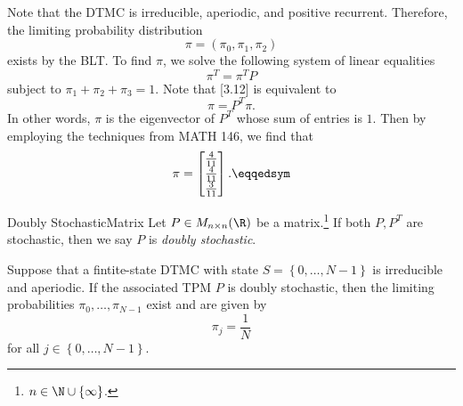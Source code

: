 \documentclass[stat333]{subfiles}
\begin{document}
    \begin{subproof}[Answer]
        Note that the DTMC is irreducible, aperiodic, and positive recurrent. Therefore, the limiting probability distribution
        \begin{equation*}
            \pi = \left( \pi_0,\pi_1,\pi_2 \right)
        \end{equation*}
        exists by the BLT. To find $\pi$, we solve the following system of linear equalities
        \begin{equation}
            \pi^{T} = \pi^{T}P
        \end{equation}
        subject to $\pi_1+\pi_2+\pi_3=1$. Note that [3.12] is equivalent to
        \begin{equation*}
            \pi = P^{T}\pi.
        \end{equation*}
        In other words, $\pi$ is the eigenvector of $P^{T}$ whose sum of entries is $1$. Then by employing the techniques from MATH 146, we find that 
        \begin{equation*}
            \pi = \begin{bmatrix} \frac{4}{11} \\ \frac{4}{11} \\ \frac{3}{11} \end{bmatrix} . \eqqedsym
        \end{equation*}
    \end{subproof}

    \begin{definition}{Doubly Stochastic}{Matrix}
        Let $P\in M_{n\times n}(\R)$ be a matrix.\footnote{$n\in\N\cup\left\lbrace \infty \right\rbrace$.} If both $P, P^{T}$ are stochastic, then we say $P$ is \emph{doubly stochastic}.
    \end{definition}

    \begin{prop}{}
        Suppose that a fintite-state DTMC with state $S = \left\lbrace 0,\ldots,N-1 \right\rbrace$ is irreducible and aperiodic. If the associated TPM $P$ is doubly stochastic, then the limiting probabilities $\pi_0,\ldots,\pi_{N-1}$ exist and are given by
        \begin{equation*}
            \pi_j = \frac{1}{N}
        \end{equation*}
        for all $j\in\left\lbrace 0,\ldots,N-1 \right\rbrace$.
    \end{prop}
\end{document}
